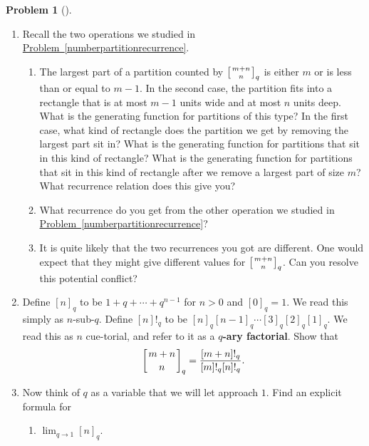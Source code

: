 \documentclass[10pt,]{book}
\newcommand{\terminology}[1]{\textbf{#1}}
\theoremstyle{plain}
\theoremstyle{definition}
\newtheorem{activity}[project]{Problem}
\theoremstyle{definition}
\numberwithin{equation}{chapter}
\newcommand{\qchoose}[2]{\left[{#1\atop#2}\right]_q}
\begin{document}
\begin{activity}[]
\begin{enumerate}[font=\bfseries,label=(\alph*),ref=\alph*]
\item\label{task-150} \marginsymbol[-2.5em]{} Recall the two operations we studied in \hyperref[numberpartitionrecurrence]{Problem~\ref{numberpartitionrecurrence}}.%
\begin{enumerate}[font=\bfseries,label=(\roman*),ref=\theenumi.\roman*]
\item\label{task-151} \marginsymbol[-2.5em]{} The largest part of a partition counted by \(\qchoose{m+n}{n}\) is either \(m\) or is less than or equal to \(m-1\).  In the second case, the partition fits into a rectangle that is at most \(m-1\) units wide and at most \(n\) units deep.  What is the generating function for partitions of this type?  In the first case, what kind of rectangle does the partition we get by removing the largest part sit in?  What is the generating function for partitions that sit in this kind of rectangle?  What is the generating function for partitions that sit in this kind of rectangle after we remove a largest part of size \(m\)?  What recurrence relation does this give you?%
\item\label{task-152} \marginsymbol[-2.5em]{} What recurrence do you get from the other operation we studied in \hyperref[numberpartitionrecurrence]{Problem~\ref{numberpartitionrecurrence}}?%
\item\label{task-153} \marginsymbol[-2.5em]{} It is quite likely that the two recurrences you got are different.  One would expect that they might give different values for \(\qchoose{m+n}{n}\).  Can you resolve this potential conflict?%
\end{enumerate}
\item\label{task-154} \marginsymbol[-2.5em]{} Define \([n]_q\) to be \(1+q+\cdots+q^{n-1}\) for \(n>0\) and \([0]_q =1\).  We read this simply as \(n\)-sub-\(q\). Define \([n]!_q\) to be \([n]_q[n-1]_q\cdots [3]_q[2]_q[1]_q\). We read this as \(n\) cue-torial, and refer to it as a \terminology{\(q\)-ary factorial}. Show that%
\begin{equation*}
\qchoose{m+n}{n} = \frac{[m+n]!_q}{[m]!_q[n]!_q}.
\end{equation*}
%
\item\label{task-155} \marginsymbol[-2.5em]{} Now think of \(q\) as a variable that we will let approach \(1\). Find an explicit formula for \leavevmode%
\begin{enumerate}[label=(\roman*)]
\item\hypertarget{li-70}{}\(\displaystyle\lim_{q\rightarrow 1} [n]_q\).%

\end{enumerate}
\end{enumerate}
\end{activity}
\end{document}
